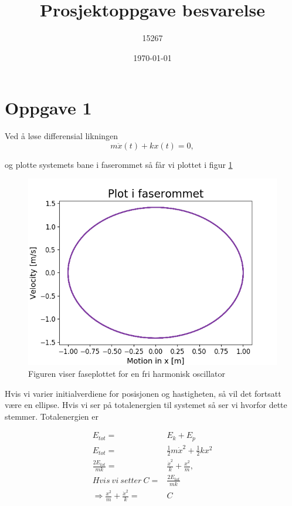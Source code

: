 \documentclass[norsk,a4paper,12pt]{article}
\title{Prosjektoppgave besvarelse}
\author{15267}
\date{\today}
\begin{document}
\maketitle


\section*{Oppgave 1}

Ved å løse differensial likningen
\\

\begin{equation}
	m\ddot{x}(t) + kx(t) =0,
\end{equation}

og plotte systemets bane i faserommet så får vi plottet i figur \ref{fig:plotoppg1}
\\
\begin{figure}[h]
	\begin{center}
	\includegraphics[scale=0.8]{Oppgave1.png}
	\caption{Figuren viser faseplottet for en fri harmonisk oscillator}
	\label{fig:plotoppg1}
	\end{center}
\end{figure}

Hvis vi varier initialverdiene for posisjonen og hastigheten, så vil det fortsatt være en ellipse. Hvis vi ser på totalenergien til systemet så ser vi hvorfor dette stemmer. Totalenergien er 

\begin{align*}
	E_{tot} =& E_k + E_p\\
	E_{tot} =& \frac{1}{2}m\dot{x}^2 + \frac{1}{2}kx^2\\
	\frac{2E_{tot}}{mk} =& \frac{\dot{x}^2}{k} + \frac{x^2}{m},\\
	Hvis\ vi\ setter\ C =& \frac{2E_{tot}}{mk}\\
	\Rightarrow \frac{x^2}{m} + \frac{\dot{x}^2}{k} =& C
\end{align*}
\end{document}
